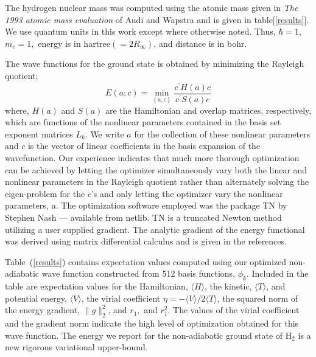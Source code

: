 The hydrogen nuclear mass was computed
using the atomic mass given in \emph{The 1993 atomic mass evaluation} of
Audi and Wapstra\cite{Audi93} and is given in table[\ref{results}].
We use quantum units in this work except where
otherwise noted. Thus, $\hbar =1,$ $m_e=1,$ energy is in hartree$\left(
=2R_\infty \right) $, and distance is in bohr. 

The wave functions for the ground state is obtained by minimizing
the Rayleigh quotient; 
\begin{equation}
E\left( a;c\right) =\min_{\left\{ a,c\right\} }\frac{c^{\prime }H(a)c}{
c^{\prime }S(a)c}  \label{energy}
\end{equation}
where,
$H\left( a\right) $ and $S\left( a\right) $ are the Hamiltonian and overlap
matrices, respectively, 
which are functions of the nonlinear parameters contained in the
basis set exponent matrices $L_k$. We write $a$ for the collection of these
nonlinear parameters and $c$ is the vector of linear coefficients in the basis
expansion of the wavefunction.
Our experience indicates that 
much more thorough optimization can be achieved
by letting the optimizer
simultaneously vary both the linear and nonlinear parameters in the
Rayleigh quotient rather than alternately solving the eigen-problem for
the $c$'s and only letting the optimizer vary the nonlinear parameters, $a$.
The optimization software employed was the package TN by Stephen Nash\cite
{NashTN} --- available from netlib\cite{netlib}. TN is a truncated Newton
method utilizing a user supplied gradient. The analytic gradient of the
energy functional was derived using matrix 
differential calculus\cite{Kinghorn95a,Kinghorn95b} and is given in 
the references\cite{Kinghorn99a}.

Table~(\ref{results})
contains expectation values computed using our 
optimized non-adiabatic wave function constructed from
512 basis functions, $\phi_k$.
Included in
the table are expectation values for the Hamiltonian, 
$\langle H \rangle$, the kinetic, $\langle T \rangle$, and
potential energy, $\langle V \rangle$, the virial coefficient 
$\eta=-\langle V \rangle /2\langle T \rangle$, the squared norm
of the energy gradient, $\|g\|_{2}^{2}$, and
$r_{1},$ and  $r_{1}^{2}$. 
The values of the virial coefficient and the
gradient norm indicate the high level of optimization
obtained for this wave function. The energy we report for the non-adiabatic
ground state of H$_2$ is a new rigorous variational upper-bound. 

